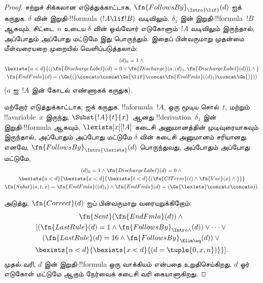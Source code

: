 \documentclass[../../../include/open-logic-section]{subfiles}
\begin{document}
\begin{proof}
  சற்றுச் சிக்கலான எடுத்துக்காட்டாக,
  $\fn{FollowsBy}_{\Intro{\lif}}(d)$ ஐக் கருதுக. $\delta$ வின்
  இறுதி-!!{formula} $(!A \lif !B)$ வடிவிலும், $\delta_1$ இன்
  இறுதி-!!{formula}~$!B$ ஆகவும், சிட்டை~$n$ உடைய $\delta$ வின் ஒவ்வோர்
  எடுகோளும்~$!A$ வடிவிலும் இருந்தால், அப்போதும் அப்போது மட்டுமே இது
  பொருந்தும். இதைப் பின்வருமாறு முதன்மை மீள்வரையறை முறையில் வெளிப்படுத்தலாம்:
  \begin{multline*}
    (d)_0 = 1 \land {}\\
    \bexists{a<d}{((\fn{DischargeLabel}(d) = 0 \lor
      \fn{Discharge}(a, (d)_1, \fn{DischargeLabel}(d))) \land {}}\\
      \fn{EndFmla}(d) = (\Gn{(} \concat a \concat \Gn{\lif}
      \concat \fn{EndFmla}((d)_1) \concat \Gn{)}))
  \end{multline*}
  ($a$ ஐ~$!A$ இன் கோடல் எண்ணாகக் கருதுக).

  மற்றோர் எடுத்துக்காட்டாக, \Intro{\lexists} ஐக் கருதுக.
  !!a{formula}~$!A$, ஒரு மூடிய சொல்~$t$, மற்றும் !!a{variable}~$x$
  இருந்து, $\Subst{!A}{t}{x}$ ஆனது !!{derivation}~$\delta_1$ இன்
  இறுதி-!!{formula} ஆகவும், $\lexists[x][!A]$ கடைசி அனுமானத்தின்
  முடிவுரையாகவும் இருந்தால், அப்போதும் அப்போது மட்டுமே $\delta$ வின்
  கடைசி அனுமானம் சரியானது. எனவே,
  $\fn{FollowsBy}_{\Intro{\lexists}}(d)$ பொருந்துவது, அப்போதும் அப்போது
  மட்டுமே,
  \begin{multline*}
    (d)_0 = 1 \land \fn{DischargeLabel}(d) = 0 \land {} \\
    \bexists{a < d}{\bexists{x<d}{\bexists{t<d}{
          (\fn{ClTerm}(t) \land \fn{Var}(x)  \land {}}}}\\
    \fn{Subst}(a,t,x) = \fn{EndFmla}((d)_1) \land
    \fn{EndFmla}(d) = (\Gn{\lexists} \concat x \concat a)).
  \end{multline*}

  அடுத்து, $\fn{Correct}(d)$ ஐப் பின்வருமாறு வரையறுக்கிறோம்:
  \begin{multline*}
    \fn{Sent}(\fn{EndFmla}(d)) \land {}\\
    [ (\fn{LastRule}(d) = 1 \land
    \fn{FollowsBy}_{\Intro\land}(d)) \lor \dots \lor {}\\
    (\fn{LastRule}(d) = 16 \land \fn{FollowsBy}_{\Elim\eq}(d)) \lor {}\\
    \bexists{n<d}{\bexists{x<d}{(d = \tuple{0, x, n})}}].
  \end{multline*}
  முதல் வரி, $d$ இன் இறுதி-!!{formula} ஒரு வாக்கியம் என்பதை
  உறுதிசெய்கிறது. $d$ ஓர் எடுகோள் மட்டுமே ஆகும் நேர்வைக் கடைசி வரி
  கையாளுகிறது.
\end{proof}
\end{document}
